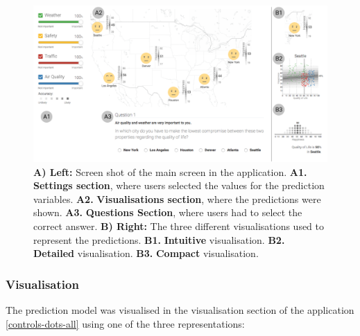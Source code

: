 \documentclass[final,5p,times,twocolumn,authoryear]{elsarticle}
\begin{document}
\begin{figure}
\centering
\includegraphics[width=\textwidth]{figures/whole_app1.png}
\caption{\textbf{A) Left:} Screen shot of the main screen in the application. \textbf{A1.} \textbf{Settings section}, where users selected the values for the prediction variables. \textbf{A2.} \textbf{Visualisations section}, where the predictions were shown. \textbf{A3.} \textbf{Questions Section}, where users had to select the correct answer. \textbf{B) Right:} The three different visualisations used to represent the predictions. \textbf{B1.} \textbf{Intuitive} visualisation. \textbf{B2.} \textbf{Detailed} visualisation. \textbf{B3.} \textbf{Compact} visualisation.}\label{2-vis}
\end{figure}


\subsubsection{Visualisation} %
\label{sub:visualisation}

The prediction model was visualised in the visualisation section of the application \ref{controls-dots-all} using one of the three representations:
\end{document}
